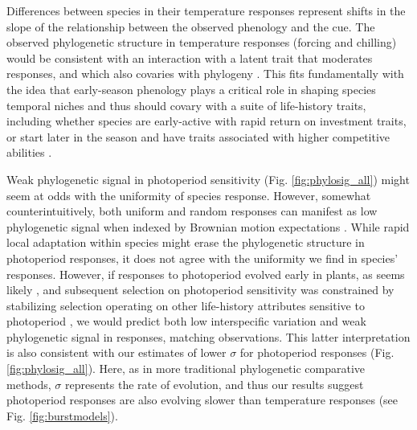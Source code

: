 \documentclass[11pt]{article}
\begin{document}
Differences between species in their temperature responses represent shifts in the slope of the relationship between the observed phenology and the cue. The observed phylogenetic structure in temperature responses (forcing and chilling) would be consistent with an interaction with a latent trait that moderates responses, and which also covaries with phylogeny \citep{davies2019phylogenetically}. This fits fundamentally with the idea that early-season phenology plays a critical role in shaping species temporal niches \citep{gotelli1996} and thus should covary with a suite of life-history traits, including whether species are early-active with rapid return on investment traits, or start later in the season and have traits associated with higher competitive abilities \citep[e.g.,][]{Grime:1977sw,wolkovich2014aob}. 


Weak phylogenetic signal in photoperiod sensitivity (Fig. \ref{fig:phylosig_all}) might seem at odds with the uniformity of species response. However, somewhat counterintuitively, both uniform and random responses can manifest as low phylogenetic signal when indexed by Brownian motion expectations \citep{wiens2010niche}. While rapid local adaptation within species might erase the phylogenetic structure in photoperiod responses, it does not agree with the uniformity we find in species' responses. However, if responses to photoperiod evolved early in plants, as seems likely \citep{serrano2017}, and subsequent selection on photoperiod sensitivity was constrained by stabilizing selection operating on other life-history attributes sensitive to photoperiod \citep[e.g.,][]{Rinne:1994,Wilczek2014,azeez2015}, we would predict both low interspecific variation and weak phylogenetic signal in responses, matching observations. This latter interpretation is also consistent with our estimates of lower $\sigma$ for photoperiod responses (Fig. \ref{fig:phylosig_all}). Here, as in more traditional phylogenetic comparative methods, $\sigma$ represents the rate of evolution, and thus our results suggest photoperiod responses are also evolving slower than temperature responses (see Fig. \ref{fig:burstmodels}).
\end{document}
